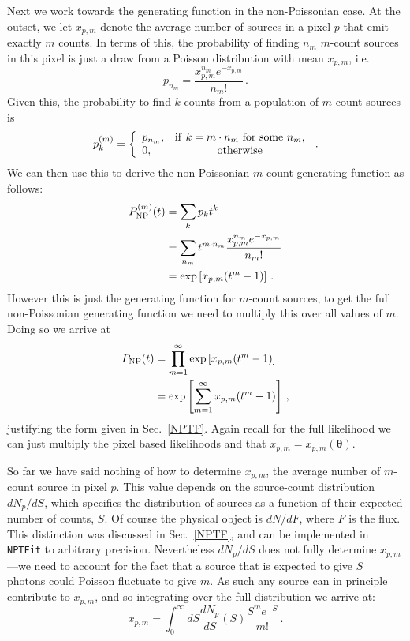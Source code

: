 Next we work towards the generating function in the non-Poissonian case. At the outset, we let $x_{p,m}$ denote the average number of sources in a pixel $p$ that emit exactly $m$ counts. In terms of this, the probability of finding $n_m$ $m$-count sources in this pixel is just a draw from a Poisson distribution with mean $x_{p,m}$, i.e.
\begin{equation}
p_{n_m} = \frac{x_{p,m}^{n_m} e^{-x_{p,m}}}{n_m!}\,.
\end{equation}
Given this, the probability to find $k$ counts from a population of $m$-count sources is
\begin{equation}
p_k^{(m)} = \left\{ \begin{array}{lc} p_{n_m}, & {\rm if}~k=m \cdot n_m~{\rm for~some~}n_m, \\ 0, & {\rm otherwise} \end{array} \right.\,.
\end{equation}
We can then use this to derive the non-Poissonian $m$-count generating function as follows:
\begin{equation}\begin{aligned}
P_{\rm NP}^{(m)}(t) &= \sum_k p_k t^k \\
&= \sum_{n_m} t^{m \cdot n_m} \frac{x_{p,m}^{n_m}e^{-x_{p,m}}}{n_m!} \\
&= \exp \left[ x_{p,m} (t^m - 1) \right]\,.
\end{aligned}\end{equation}
However this is just the generating function for $m$-count sources, to get the full non-Poissonian generating function we need to multiply this over all values of $m$. Doing so we arrive at
\begin{equation}\begin{aligned}
P_{\rm NP}(t) &= \prod_{m=1}^{\infty} \exp \left[ x_{p,m} (t^m - 1) \right] \\
&= \exp \left[ \sum_{m=1}^{\infty} x_{p,m} (t^m - 1) \right]\,,
\end{aligned}\end{equation}
justifying the form given in Sec.~\ref{NPTF}. Again recall for the full likelihood we can just multiply the pixel based likelihoods and that  $x_{p,m} = x_{p,m}(\bm{\theta})$.

So far we have said nothing of how to determine $x_{p,m}$, the average number of $m$-count source in pixel $p$. This value depends on the source-count distribution $dN_p/dS$, which specifies the distribution of sources as a function of their expected number of counts, $S$. Of course the physical object is $dN/dF$, where $F$ is the flux. This distinction was discussed in Sec.~\ref{NPTF}, and can be implemented in \texttt{NPTFit} to arbitrary precision. Nevertheless $dN_p/dS$ does not fully determine $x_{p,m}$---we need to account for the fact that a source that is expected to give $S$ photons could Poisson fluctuate to give $m$. As such any source can in principle contribute to $x_{p,m}$, and so integrating over the full distribution we arrive at:
\begin{equation}
x_{p,m} = \int_0^{\infty} dS \frac{dN_p}{dS}(S) \frac{S^m e^{-S}}{m!}\,.
\label{eq:xpm}
\end{equation}

